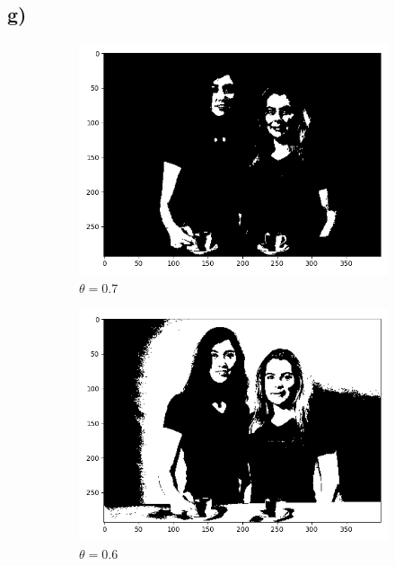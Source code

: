 \documentclass{scrartcl}
\begin{document}
\subsection*{g)}
\begin{figure}[h]
	\centering
	\begin{subfigure}[b]{0.45\textwidth}
		\centering
		\includegraphics[width=\textwidth]{images/skinTheta0.7}
		\caption{$\theta=0.7$}
	\end{subfigure}
	\hfill
	\begin{subfigure}[b]{0.45\textwidth}
		\centering
		\includegraphics[width=\textwidth]{images/skinTheta0.6}
		\caption{$\theta=0.6$}
	\end{subfigure}
	\hfill
	\quad
	\begin{subfigure}[b]{0.45\textwidth}

\end{subfigure}
\end{figure}
\end{document}
